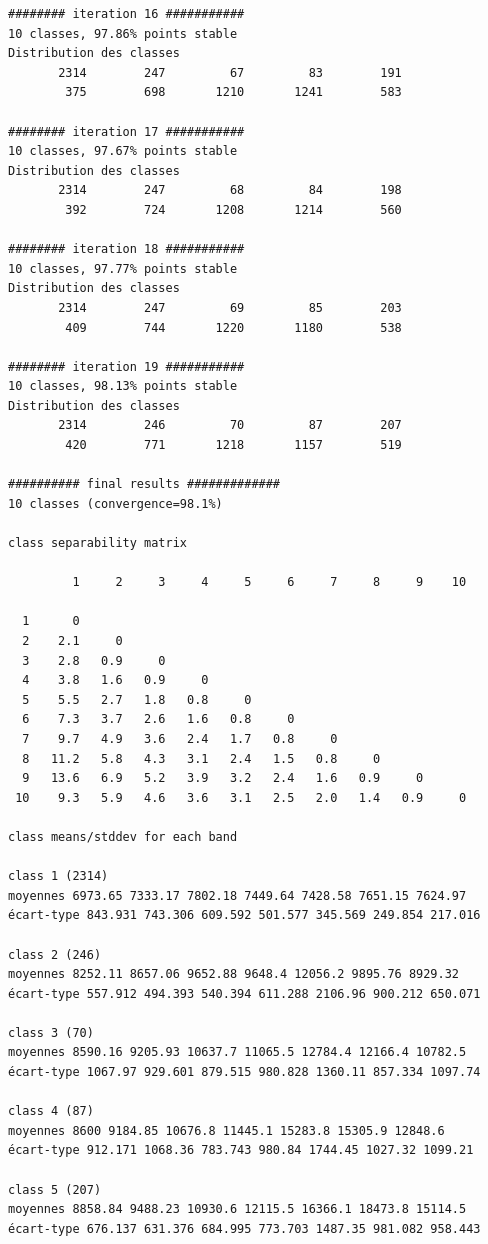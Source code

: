 \documentclass[land,article,submit,pdftex,moreauthors]{Definitions/mdpi}
\begin{document}
\begin{scriptsize}
\begin{verbatim}
######## iteration 16 ###########
10 classes, 97.86% points stable
Distribution des classes
       2314        247         67         83        191
        375        698       1210       1241        583

######## iteration 17 ###########
10 classes, 97.67% points stable
Distribution des classes
       2314        247         68         84        198
        392        724       1208       1214        560

######## iteration 18 ###########
10 classes, 97.77% points stable
Distribution des classes
       2314        247         69         85        203
        409        744       1220       1180        538

######## iteration 19 ###########
10 classes, 98.13% points stable
Distribution des classes
       2314        246         70         87        207
        420        771       1218       1157        519

########## final results #############
10 classes (convergence=98.1%)

class separability matrix

         1     2     3     4     5     6     7     8     9    10

  1      0
  2    2.1     0
  3    2.8   0.9     0
  4    3.8   1.6   0.9     0
  5    5.5   2.7   1.8   0.8     0
  6    7.3   3.7   2.6   1.6   0.8     0
  7    9.7   4.9   3.6   2.4   1.7   0.8     0
  8   11.2   5.8   4.3   3.1   2.4   1.5   0.8     0
  9   13.6   6.9   5.2   3.9   3.2   2.4   1.6   0.9     0
 10    9.3   5.9   4.6   3.6   3.1   2.5   2.0   1.4   0.9     0

class means/stddev for each band

class 1 (2314)
moyennes 6973.65 7333.17 7802.18 7449.64 7428.58 7651.15 7624.97
écart-type 843.931 743.306 609.592 501.577 345.569 249.854 217.016

class 2 (246)
moyennes 8252.11 8657.06 9652.88 9648.4 12056.2 9895.76 8929.32
écart-type 557.912 494.393 540.394 611.288 2106.96 900.212 650.071

class 3 (70)
moyennes 8590.16 9205.93 10637.7 11065.5 12784.4 12166.4 10782.5
écart-type 1067.97 929.601 879.515 980.828 1360.11 857.334 1097.74

class 4 (87)
moyennes 8600 9184.85 10676.8 11445.1 15283.8 15305.9 12848.6
écart-type 912.171 1068.36 783.743 980.84 1744.45 1027.32 1099.21

class 5 (207)
moyennes 8858.84 9488.23 10930.6 12115.5 16366.1 18473.8 15114.5
écart-type 676.137 631.376 684.995 773.703 1487.35 981.082 958.443


\end{verbatim}
\end{scriptsize}
\end{document}
